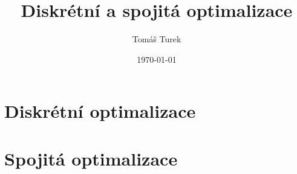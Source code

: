 

\usepackage{babel}

\title{Diskrétní a spojitá optimalizace}
\author{Tomáš Turek}
\date{\today}


	\maketitle
	\tableofcontents
	\part{Diskrétní optimalizace}
	\part{Spojitá optimalizace}
